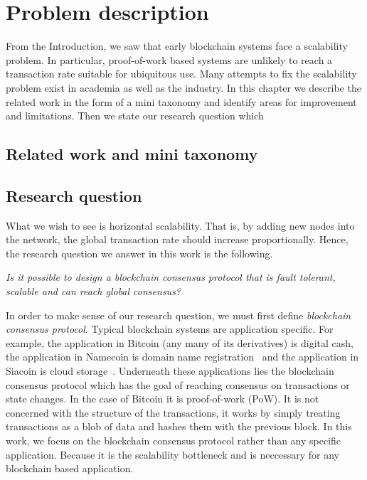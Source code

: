 \chapter{Problem description}
\label{ch:problem}

From the Introduction, we saw that early blockchain systems face a scalability problem.
In particular, proof-of-work based systems are unlikely to reach a transaction rate suitable for ubiquitous use.
Many attempts to fix the scalability problem exist in academia as well as the industry.
In this chapter we describe the related work in the form of a mini taxonomy and identify areas for improvement and limitations.
Then we state our research question which 

\section{Related work and mini taxonomy}


\section{Research question}

What we wish to see is horizontal scalability.
That is, by adding new nodes into the network, the global transaction rate should increase proportionally.
Hence, the research question we answer in this  work is the following.
\begin{displayquote}
\emph{Is it possible to design a blockchain consensus protocol that is fault tolerant, scalable and can reach global consensus?}
\end{displayquote}

In order to make sense of our research question, we must first define \emph{blockchain consensus protocol}.
Typical blockchain systems are application specific.
For example, the application in Bitcoin (any many of its derivatives) is digital cash, the application in Namecoin is domain name registration~\cite{namecoin} and the application in Siacoin is cloud storage~\cite{siacoin}.
Underneath these applications lies the blockchain consensus protocol which has the goal of reaching consensus on transactions or state changes.
In the case of Bitcoin it is proof-of-work (PoW).
It is not concerned with the structure of the transactions,
it works by simply treating transactions as a blob of data and hashes them with the previous block.
In this work, we focus on the blockchain consensus protocol rather than any specific application.
Because it is the scalability bottleneck and is neccessary for any blockchain based application.

